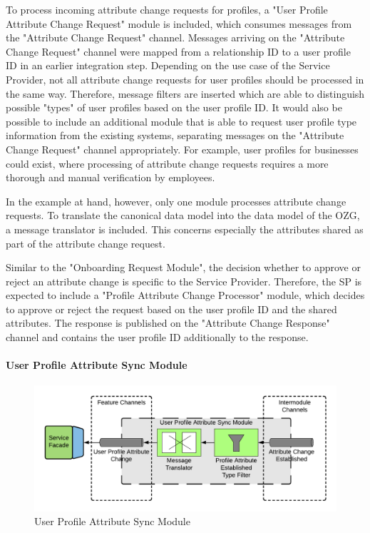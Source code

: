To process incoming attribute change requests for profiles, a "User Profile Attribute Change Request" module is included, which consumes messages from the "Attribute Change Request" channel. Messages arriving on the "Attribute Change Request" channel were mapped from a relationship ID to a user profile ID in an earlier integration step. Depending on the use case of the Service Provider, not all attribute change requests for user profiles should be processed in the same way. Therefore, message filters are inserted which are able to distinguish possible "types" of user profiles based on the user profile ID. It would also be possible to include an additional module that is able to request user profile type information from the existing systems, separating messages on the "Attribute Change Request" channel appropriately. For example, user profiles for businesses could exist, where processing of attribute change requests requires a more thorough and manual verification by employees. 

In the example at hand, however, only one module processes attribute change requests. To translate the canonical data model into the data model of the OZG, a message translator is included. This concerns especially the attributes shared as part of the attribute change request.

Similar to the "Onboarding Request Module", the decision whether to approve or reject an attribute change is specific to the Service Provider. Therefore, the SP is expected to include a "Profile Attribute Change Processor" module, which decides to approve or reject the request based on the user profile ID and the shared attributes. The response is published on the "Attribute Change Response" channel and contains the user profile ID additionally to the response.

\paragraph{User Profile Attribute Sync Module}

\begin{figure}[h!]
    \centering
    \includegraphics[scale=0.6]{Diagrams/Integration Architecture 1/Technological Integration/13. User Profile Attribute Sync Module.pdf}
    \caption{User Profile Attribute Sync Module}
    \label{integration1:user_profile_attribute_sync_module}
\end{figure}

